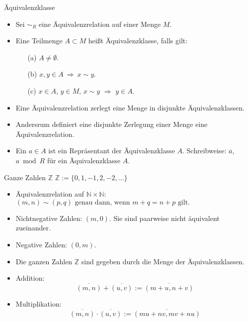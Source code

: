 \documentclass[notes=hide,hyperref={dvipdfmx,pdfpagelabels=false}]{beamer}
\begin{document}
\begin{frame}{Äquivalenzklasse}
\begin{itemize}
\item Sei $\sim_R$ eine Äquivalenzrelation auf einer Menge $M$.
\item Eine Teilmenge $A \subset M$ heißt {\color{red} Äquivalenzklasse}, falls gilt:
\begin{itemize}
\item [(a)] $A \neq \emptyset$.
\item [(b)] $x,y \in A \ \Rightarrow \ x \sim y$.
\item [(c)] $x \in A$, $y \in M$, $x \sim y$ $\Rightarrow$ $y \in A$.
\end{itemize}
\item Eine Äquivalenzrelation zerlegt eine Menge in disjunkte
Äquivalenzklassen.  
\item Andersrum definiert eine disjunkte Zerlegung einer Menge eine Äquivalenzrelation.
\item  Ein $a \in A$ ist ein {\color{red} Repräsentant} der Äquivalenzklasse
$A$. Schreibweise: $\overline{a}$, $a \bmod R$ für ein Äquivalenzklasse $A$. 
\end{itemize}
\end{frame}

\begin{frame}{Ganze Zahlen $\mathbb{Z}$}
$\mathbb{Z}:=\{ 0,1,-1,2,-2,\dots \}$
\begin{itemize}
\item Äquivalenzrelation auf $\mathbb{N} \times \mathbb{N}$:\\
$(m,n) \sim (p,q) \mbox{ genau dann, wenn } m+q=n+p \mbox{ gilt.} $
\item Nichtnegative Zahlen: $(m,0)$. Sie sind paarweise nicht äquivalent
zueinander.
\item Negative Zahlen: $(0,m)$. 
\item Die ganzen Zahlen $\mathbb{Z}$ sind  gegeben durch die Menge
der Äquivalenzklassen.
\item Addition:
\[
\overline{(m,n)}+\overline{(u,v)}:=\overline{(m+u,n+v)}\]
\item Multiplikation:
\[
\overline{(m,n)}\cdot\overline{(u,v)}:=\overline{(m u+nv,mv+nu)}
\]
\end{itemize}
\end{frame}
\end{document}
